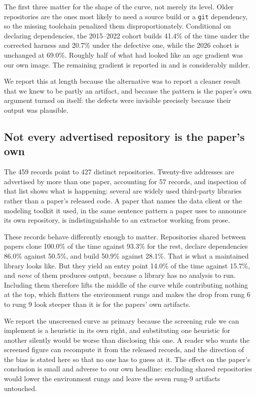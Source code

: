 The first three matter for the shape of the curve, not merely its level. Older
repositories are the ones most likely to need a source build or a \texttt{git}
dependency, so the missing toolchain penalized them disproportionately.
Conditional on declaring dependencies, the 2015--2022 cohort builds 41.4\% of the
time under the corrected harness and 20.7\% under the defective one, while the
2026 cohort is unchanged at 69.0\%. Roughly half of what had looked like an age
gradient was our own image. The remaining gradient is reported in
 and is considerably milder.

We report this at length because the alternative was to report a cleaner result
that we knew to be partly an artifact, and because the pattern is the paper's own
argument turned on itself: the defects were invisible precisely because their
output was plausible.

\subsection{Not every advertised repository is the paper's own}\label{sec:shared_repos}

The 459 records point to 427 distinct repositories. Twenty-five addresses are
advertised by more than one paper, accounting for 57 records, and inspection of
that list shows what is happening: several are widely used third-party libraries
rather than a paper's released code. A paper that names the data client or the
modeling toolkit it used, in the same sentence pattern a paper uses to announce
its own repository, is indistinguishable to an extractor working from prose.

These records behave differently enough to matter. Repositories shared between
papers clone 100.0\% of the time against 93.3\% for the rest, declare
dependencies 86.0\% against 50.5\%, and build 50.9\% against 28.1\%. That is what
a maintained library looks like. But they yield an entry point 14.0\% of the time
against 15.7\%, and \emph{none} of them produces output, because a library has no
analysis to run. Including them therefore lifts the middle of the curve
while contributing nothing at the top, which flatters the environment rungs and
makes the drop from rung 6 to rung 9 look steeper than it is for the papers'
own artifacts.

We report the unscreened curve as primary because the screening rule we can
implement is a heuristic in its own right, and substituting one heuristic for
another silently would be worse than disclosing this one. A reader who wants the
screened figure can recompute it from the released records, and the direction of
the bias is stated here so that no one has to guess at it. The effect on the
paper's conclusion is small and adverse to our own headline: excluding shared
repositories would lower the environment rungs and leave the seven rung-9
artifacts untouched.

